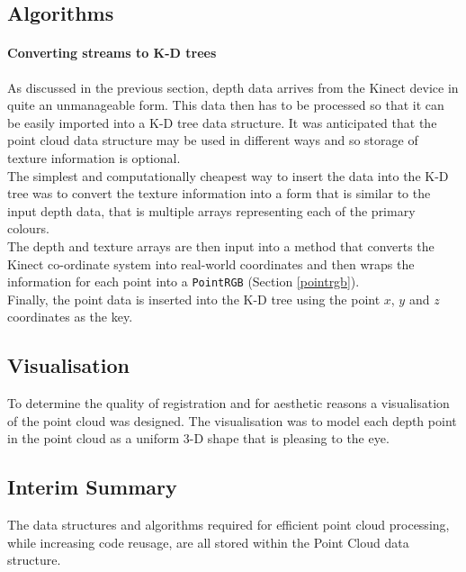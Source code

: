 \subsection{Algorithms}
\paragraph{Converting streams to K-D trees}
As discussed in the previous section, depth data arrives from the Kinect device in quite an unmanageable form. This data then has to be processed so that it can be easily imported into a K-D tree data structure. It was anticipated that the point cloud data structure may be used in different ways and so storage of texture information is optional. \\

The simplest and computationally cheapest way to insert the data into the K-D tree was to convert the texture information into a form that is similar to the input depth data, that is multiple arrays representing each of the primary colours. \\

The depth and texture arrays are then input into a method that converts the Kinect co-ordinate system into real-world coordinates and then wraps the information for each point into a \texttt{PointRGB} (Section \ref{pointrgb}). \\

Finally, the point data is inserted into the K-D tree using the point $x$, $y$ and $z$ coordinates as the key. 

\subsection{Visualisation}
To determine the quality of registration and for aesthetic reasons a visualisation of the point cloud was designed. The visualisation was to model each depth point in the point cloud as a uniform 3-D shape that is pleasing to the eye. 

\subsection{Interim Summary}
The data structures and algorithms required for efficient point cloud processing, while increasing code reusage, are all stored within the Point Cloud data structure. \\ 